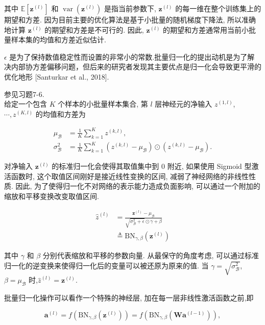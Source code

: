 \documentclass[10pt]{article}
\begin{document}
其中 $\mathbb{E}\left[\boldsymbol{z}^{(l)}\right]$ 和 $\operatorname{var}\left(\boldsymbol{z}^{(l)}\right)$ 是指当前参数下, $\boldsymbol{z}^{(l)}$ 的每一维在整个训练集上的期望和方差. 因为目前主要的优化算法是基于小批量的随机梯度下降法, 所以准确地计算 $\boldsymbol{z}^{(l)}$ 的期望和方差是不可行的. 因此, $\boldsymbol{z}^{(l)}$ 的期望和方差通常用当前小批量样本集的均值和方差近似估计.

$\epsilon$ 是为了保持数值稳定性而设置的非常小的常数.批量归一化的提出动机是为了解决内部协方差偏移问题，但后来的研究者发现其主要优点是归一化会导致更平滑的优化地形 [Santurkar et al., 2018].

参见习题7-6.\\
给定一个包含 $K$ 个样本的小批量样本集合, 第 $l$ 层神经元的净输入 $z^{(1, l)}$, $\cdots, z^{(K, l)}$ 的均值和方差为


\begin{align*}
\mu_{\mathcal{B}} & =\frac{1}{K} \sum_{k=1}^{K} z^{(k, l)},  \tag{7.53}\\
\sigma_{\mathcal{B}}^{2} & =\frac{1}{K} \sum_{k=1}^{K}\left(z^{(k, l)}-\mu_{\mathcal{B}}\right) \odot\left(z^{(k, l)}-\mu_{\mathcal{B}}\right) . \tag{7.54}
\end{align*}


对净输入 $\boldsymbol{z}^{(l)}$ 的标准归一化会使得其取值集中到 0 附近, 如果使用 Sigmoid 型激活函数时, 这个取值区间刚好是接近线性变换的区间, 减弱了神经网络的非线性性质. 因此, 为了使得归一化不对网络的表示能力造成负面影响, 可以通过一个附加的缩放和平移变换改变取值区间.


\begin{align*}
\hat{z}^{(l)} & =\frac{\boldsymbol{z}^{(l)}-\mu_{\mathcal{B}}}{\sqrt{\sigma_{\mathcal{B}}^{2}+\epsilon} \odot \gamma+\beta}  \tag{7.55}\\
& \triangleq \mathrm{BN}_{\gamma, \beta}\left(\boldsymbol{z}^{(l)}\right) \tag{7.56}
\end{align*}


其中 $\gamma$ 和 $\beta$ 分别代表缩放和平移的参数向量. 从最保守的角度考虑, 可以通过标准归一化的逆变换来使得归一化后的变量可以被还原为原来的值. 当 $\gamma=\sqrt{\sigma_{\mathcal{B}}^{2}}$, $\beta=\mu_{\mathcal{B}}$ 时,$\hat{z}^{(l)}=\boldsymbol{z}^{(l)}$.

批量归一化操作可以看作一个特殊的神经层, 加在每一层非线性激活函数之前,即


\begin{equation*}
\boldsymbol{a}^{(l)}=f\left(\mathrm{BN}_{\gamma, \beta}\left(\boldsymbol{z}^{(l)}\right)\right)=f\left(\mathrm{BN}_{\gamma, \beta}\left(\boldsymbol{W} \boldsymbol{a}^{(l-1)}\right)\right), \tag{7.57}
\end{equation*}
\end{document}
